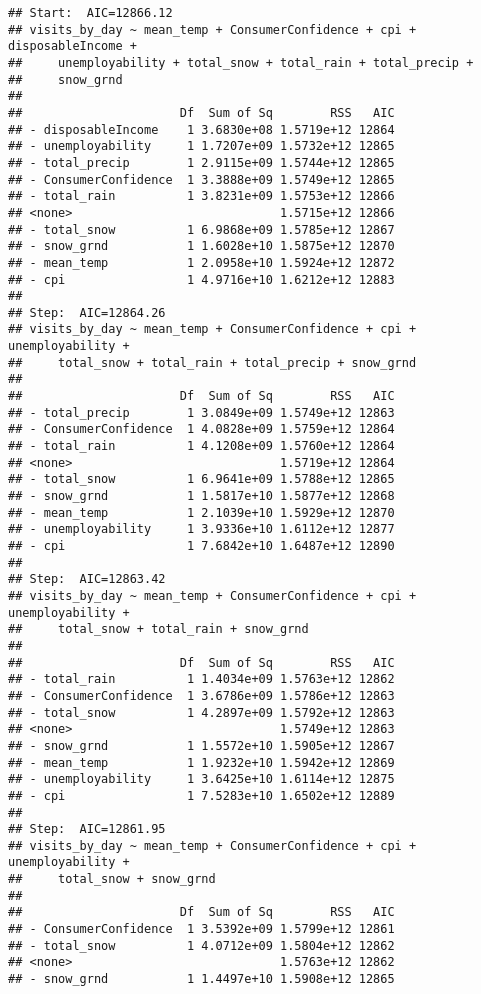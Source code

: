 \documentclass[
]{article}
\begin{document}
\begin{verbatim}
## Start:  AIC=12866.12
## visits_by_day ~ mean_temp + ConsumerConfidence + cpi + disposableIncome + 
##     unemployability + total_snow + total_rain + total_precip + 
##     snow_grnd
## 
##                      Df  Sum of Sq        RSS   AIC
## - disposableIncome    1 3.6830e+08 1.5719e+12 12864
## - unemployability     1 1.7207e+09 1.5732e+12 12865
## - total_precip        1 2.9115e+09 1.5744e+12 12865
## - ConsumerConfidence  1 3.3888e+09 1.5749e+12 12865
## - total_rain          1 3.8231e+09 1.5753e+12 12866
## <none>                             1.5715e+12 12866
## - total_snow          1 6.9868e+09 1.5785e+12 12867
## - snow_grnd           1 1.6028e+10 1.5875e+12 12870
## - mean_temp           1 2.0958e+10 1.5924e+12 12872
## - cpi                 1 4.9716e+10 1.6212e+12 12883
## 
## Step:  AIC=12864.26
## visits_by_day ~ mean_temp + ConsumerConfidence + cpi + unemployability + 
##     total_snow + total_rain + total_precip + snow_grnd
## 
##                      Df  Sum of Sq        RSS   AIC
## - total_precip        1 3.0849e+09 1.5749e+12 12863
## - ConsumerConfidence  1 4.0828e+09 1.5759e+12 12864
## - total_rain          1 4.1208e+09 1.5760e+12 12864
## <none>                             1.5719e+12 12864
## - total_snow          1 6.9641e+09 1.5788e+12 12865
## - snow_grnd           1 1.5817e+10 1.5877e+12 12868
## - mean_temp           1 2.1039e+10 1.5929e+12 12870
## - unemployability     1 3.9336e+10 1.6112e+12 12877
## - cpi                 1 7.6842e+10 1.6487e+12 12890
## 
## Step:  AIC=12863.42
## visits_by_day ~ mean_temp + ConsumerConfidence + cpi + unemployability + 
##     total_snow + total_rain + snow_grnd
## 
##                      Df  Sum of Sq        RSS   AIC
## - total_rain          1 1.4034e+09 1.5763e+12 12862
## - ConsumerConfidence  1 3.6786e+09 1.5786e+12 12863
## - total_snow          1 4.2897e+09 1.5792e+12 12863
## <none>                             1.5749e+12 12863
## - snow_grnd           1 1.5572e+10 1.5905e+12 12867
## - mean_temp           1 1.9232e+10 1.5942e+12 12869
## - unemployability     1 3.6425e+10 1.6114e+12 12875
## - cpi                 1 7.5283e+10 1.6502e+12 12889
## 
## Step:  AIC=12861.95
## visits_by_day ~ mean_temp + ConsumerConfidence + cpi + unemployability + 
##     total_snow + snow_grnd
## 
##                      Df  Sum of Sq        RSS   AIC
## - ConsumerConfidence  1 3.5392e+09 1.5799e+12 12861
## - total_snow          1 4.0712e+09 1.5804e+12 12862
## <none>                             1.5763e+12 12862
## - snow_grnd           1 1.4497e+10 1.5908e+12 12865

\end{verbatim}
\end{document}
